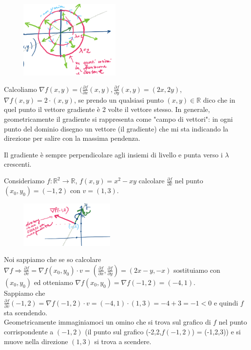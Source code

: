 \begin{figure}
    \vspace{-30pt}
    \centering
    \includegraphics[width=5cm]{images/sign-geom-gradiante.png}
\end{figure}

Calcoliamo $\nabla f(x,y) = \big( \frac{\partial f}{\partial x}(x,y), \frac{\partial f}{\partial y}(x,y) = (2x, 2y)$, $\nabla f(x,y) = 2 \cdot (x,y)$, se prendo un qualsiasi punto $(x,y) \in \mathbb{R}$ dico che in quel punto il vettore gradiente è 2 volte il vettore stesso. In generale, geometricamente il gradiente si rappresenta come "campo di vettori": in ogni punto del dominio disegno un vettore (il gradiente) che mi sta indicando la direzione per salire con la massima pendenza.

\begin{observation}
Il gradiente è sempre perpendicolare agli insiemi di livello e punta verso i $\lambda$ crescenti.
\end{observation}

\begin{example}
Consideriamo $f:\mathbb{R}^2 \to \mathbb{R}$, $f(x,y) = x^2 -xy$ calcolare $\frac{\partial f}{\partial v}$ nel punto $(x_0,y_0) = (-1,2)$ con $v = (1,3)$.
\end{example}
\begin{figure}
    \vspace{-10pt}
    \centering
    \includegraphics[width=4.7cm]{images/ess-gradiante-1.png}
\end{figure}
Noi sappiamo che se so calcolare $\nabla f \Longrightarrow \frac{\partial f}{\partial v} = \nabla f(x_0, y_0) \cdot v = (\frac{\partial f}{\partial x}, \frac{\partial f}{\partial y}) = (2x - y, -x)$ sostituiamo con $(x_0,y_0)$ ed otteniamo $\nabla f(x_0,y_0) = \nabla f(-1,2) = (-4, 1)$.\\
Sappiamo che $\frac{\partial f}{\partial v}(-1,2) = \nabla f(-1,2) \cdot v = (-4,1)\cdot(1,3) = -4 + 3 = -1 < 0$ e quindi $f$ sta scendendo.\\
Geometricamente immaginiamoci un omino che si trova sul grafico di $f$ nel punto corrispondente a $(-1,2)$ (il punto sul grafico (-2,2,$f(-1,2)$) = (-1,2,3)) e si muove nella direzione $(1,3)$ si trova a scendere.

